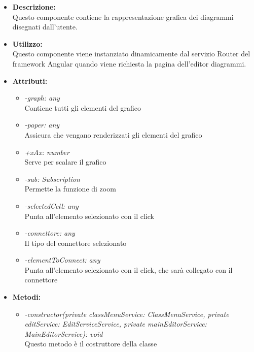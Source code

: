 				\begin{itemize}
          			\item \textbf{Descrizione:}\\
          			Questo componente contiene la rappresentazione grafica dei diagrammi disegnati dall’utente.
          			\item \textbf{Utilizzo:}\\
          			Questo componente viene instanziato dinamicamente dal servizio Router del framework Angular quando viene richiesta la pagina dell’editor diagrammi.
          			\item \textbf{Attributi:}\\
          			\begin{itemize}
          				\item \emph{-graph: any}\\
            			Contiene tutti gli elementi del grafico
            			\item \emph{-paper: any}\\
            			Assicura che vengano renderizzati gli elementi del grafico
            			\item \emph{+xAx: number}\\
            			Serve per scalare il grafico
            			\item \emph{-sub: Subscription}\\
            			Permette la funzione di zoom
            			\item \emph{-selectedCell: any}\\
            			Punta all'elemento selezionato con il click
            			\item \emph{-connettore: any}\\
            			Il tipo del connettore selezionato
            			\item \emph{-elementToConnect: any}\\
            			Punta all'elemento selezionato con il click, che sarà collegato con il connettore
          			\end{itemize}
          			\item \textbf{Metodi:}\\
          			\begin{itemize}
          				\item \emph{-constructor(private classMenuService: ClassMenuService, private editService: EditServiceService, private mainEditorService: MainEditorService): void}\\
          				Questo metodo è il costruttore della classe

\end{itemize}
\end{itemize}
